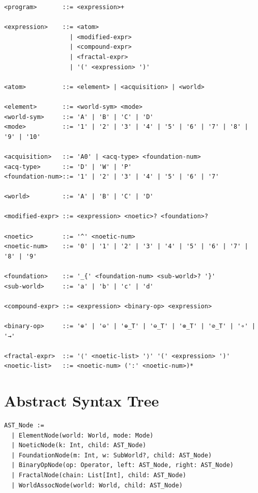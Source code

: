 \begin{definition}
\label{def:bnf-grammar}
\begin{verbatim}
<program>       ::= <expression>+

<expression>    ::= <atom>
                  | <modified-expr>
                  | <compound-expr>
                  | <fractal-expr>
                  | '(' <expression> ')'

<atom>          ::= <element> | <acquisition> | <world>

<element>       ::= <world-sym> <mode>
<world-sym>     ::= 'A' | 'B' | 'C' | 'D'
<mode>          ::= '1' | '2' | '3' | '4' | '5' | '6' | '7' | '8' | '9' | '10'

<acquisition>   ::= 'A0' | <acq-type> <foundation-num>
<acq-type>      ::= 'D' | 'W' | 'P'
<foundation-num>::= '1' | '2' | '3' | '4' | '5' | '6' | '7'

<world>         ::= 'A' | 'B' | 'C' | 'D'

<modified-expr> ::= <expression> <noetic>? <foundation>?

<noetic>        ::= '^' <noetic-num>
<noetic-num>    ::= '0' | '1' | '2' | '3' | '4' | '5' | '6' | '7' | '8' | '9'

<foundation>    ::= '_{' <foundation-num> <sub-world>? '}'
<sub-world>     ::= 'a' | 'b' | 'c' | 'd'

<compound-expr> ::= <expression> <binary-op> <expression>

<binary-op>     ::= '⊕' | '⊖' | '⊕_T' | '⊖_T' | '⊗_T' | '⊘_T' | '∘' | '→'

<fractal-expr>  ::= '⟨' <noetic-list> '⟩' '(' <expression> ')'
<noetic-list>   ::= <noetic-num> (':' <noetic-num>)*
\end{verbatim}
\end{definition}

\section{Abstract Syntax Tree}

\begin{definition}
\label{def:ast-nodes}
\begin{verbatim}
AST_Node :=
  | ElementNode(world: World, mode: Mode)
  | NoeticNode(k: Int, child: AST_Node)
  | FoundationNode(m: Int, w: SubWorld?, child: AST_Node)
  | BinaryOpNode(op: Operator, left: AST_Node, right: AST_Node)
  | FractalNode(chain: List[Int], child: AST_Node)
  | WorldAssocNode(world: World, child: AST_Node)
\end{verbatim}
\end{definition}

